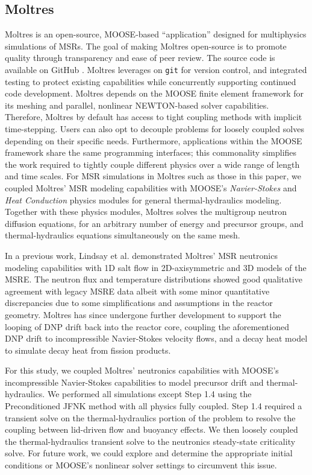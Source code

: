 \subsection{Moltres}

Moltres \cite{lindsay_introduction_2018} is an open-source, \gls{MOOSE}-based
``application'' designed for multiphysics simulations of \glspl{MSR}. The goal
of making Moltres open-source is to promote quality through transparency and
ease of peer review. The source code \cite{lindsay_moltres_2017} is available
on GitHub \cite{github_build_2017}. Moltres leverages on \texttt{git} for
version control, and integrated testing to protect existing capabilities while
concurrently supporting continued code development. Moltres depends on the
\gls{MOOSE} finite element framework for its meshing and parallel, nonlinear
NEWTON-based solver capabilities. Therefore,
Moltres by default has access to tight coupling methods with implicit
time-stepping. Users can also opt to decouple problems for loosely coupled
solves depending on their specific needs. Furthermore, applications within the
\gls{MOOSE} framework share the same programming
interfaces; this commonality simplifies the work required to tightly couple
different physics over a wide range of length and time scales. For \gls{MSR}
simulations in Moltres such as those in this paper, we coupled Moltres'
\gls{MSR} modeling capabilities with \gls{MOOSE}'s \textit{Navier-Stokes} and
\textit{Heat Conduction} physics modules \cite{peterson_overview_2017} for
general thermal-hydraulics modeling. Together with these physics modules,
Moltres solves the multigroup neutron diffusion equations, for an arbitrary
number of energy and precursor groups, and thermal-hydraulics equations
simultaneously on the same mesh.

In a previous work, Lindsay et al. \cite{lindsay_introduction_2018}
demonstrated Moltres' \gls{MSR} neutronics modeling capabilities with 1D salt
flow in 2D-axisymmetric and 3D models of the \gls{MSRE}. The neutron flux and
temperature distributions showed good qualitative agreement with legacy
\gls{MSRE} data albeit with some minor quantitative discrepancies due to some
simplifications and assumptions in the reactor geometry. Moltres has
since undergone further development to support the looping of \gls{DNP} drift
back into the reactor core, coupling the aforementioned \gls{DNP} drift
to incompressible Navier-Stokes velocity flows, and a decay heat model to
simulate decay heat from fission products.

For this study, we coupled Moltres'
neutronics capabilities with \gls{MOOSE}'s incompressible Navier-Stokes
capabilities \cite{peterson_overview_2017} to
model precursor drift and thermal-hydraulics. We performed all simulations
except Step 1.4 using the Preconditioned \gls{JFNK} method with all physics
fully coupled. Step 1.4 required a transient solve on the thermal-hydraulics
portion of the problem to resolve the coupling between lid-driven flow and
buoyancy effects. We then loosely coupled the thermal-hydraulics transient
solve to the neutronics steady-state criticality solve. For future work, we
could explore and determine the appropriate initial conditions or \gls{MOOSE}'s
nonlinear solver settings to circumvent this issue.

